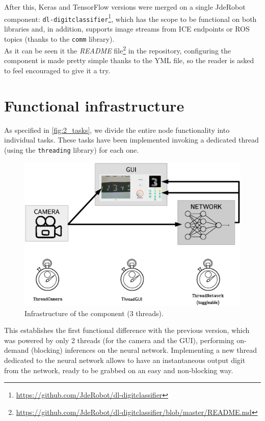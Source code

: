 		After this, Keras and TensorFlow versions were merged on a single JdeRobot component: \texttt{dl-digitclassifier}\footnote{\url{https://github.com/JdeRobot/dl-digitclassifier}}, which has the scope to be functional on both libraries and, in addition, supports image streams from ICE endpoints or ROS topics (thanks to the \texttt{comm} library).\\
		
		As it can be seen it the \emph{README} file\footnote{\url{https://github.com/JdeRobot/dl-digitclassifier/blob/master/README.md}} in the repository, configuring the component is made pretty simple thanks to the YML file, so the reader is asked to feel encouraged to give it a try.\\
		
	\section{Functional infrastructure}
		As specified in \autoref{fig:2_tasks}, we divide the entire node functionality into individual tasks. These tasks have been implemented invoking a dedicated thread (using the \texttt{threading} library) for each one.\\
		
		\begin{figure}[h]
			\centering
			\includegraphics[width=5in]{images/digitclassifier_infrastructure}
			\caption{Infrastructure of the component (3 threads).}
			\label{fig:4_digitclassifier_infrastructure}
		\end{figure}
		
		
		
		This establishes the first functional difference with the previous version, which was powered by only 2 threads (for the camera and the GUI), performing on-demand (blocking) inferences on the neural network. Implementing a new thread dedicated to the neural network allows to have an instantaneous output digit from the network, ready to be grabbed on an easy and non-blocking way.\\
		
